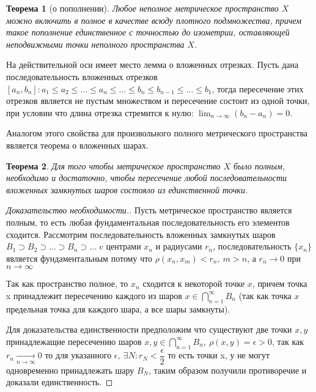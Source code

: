 \documentclass[14pt,a4paper]{extarticle}
\newtheorem{theorem}{Теорема}[section]
\theoremstyle{definition}
\theoremstyle{remark}
\renewcommand{\[}{\begin{dmath*}[compact]}
\renewcommand{\]}{\end{dmath*}}
\newcommand{\ds}{\displaystyle}
\newcommand{\sep}{ , \ \allowbreak }
\newcommand\f[2]{\dfrac{#1}{#2}}
\begin{document}
\begin{theorem}[о пополнении]
\label{th:о пополнении}
  Любое неполное метрическое пространство $X$ можно
  включить в полное в качестве всюду плотного подмножества,
  причем такое пополнение единственное с точностью до изометрии,
  оставляющей неподвижными точки неполного пространства $X$.
\end{theorem}

На действительной оси имеет место лемма о вложенных отрезках. Пусть дана
последовательность вложенных отрезков $[a_n, b_n]: a_1 \leq a_2 \leq \dots \leq
a_n \leq \dots \leq b_n \leq b_{n-1} \leq \dots \leq b_1 $, тогда пересечение
этих отрезков является не пустым множеством и пересечение состоит из одной
точки, при условии что длина отрезка стремится к нулю:
$\ds \lim_{n \to \infty}(b_n - a_n) = 0$.

Аналогом этого свойства для произвольного полного метрического пространства
является теорема о вложенных шарах.

\begin{theorem}
  Для того чтобы метрическое пространство $X$ было полным,
  необходимо и достаточно, чтобы пересечение любой последовательности вложенных
  замкнутых шаров состояло из единственной точки.
\end{theorem}

\begin{proof}[Доказательство необходимости.]
  Пусть метрическое пространство является полным, то есть любая фундаментальная
  последовательность его элементов сходится. Рассмотрим последовательность
  вложенных замкнутых шаров
  $B_{1} \supset B_{2} \supset \dots \supset B_{n} \supset \dots$
  c центрами $x_{n}$ и радиусами $r_{n}$, последовательность $\{x_n\}$ является
  фундаментальным потому что $\rho(x_n, x_m) < r_n\sep m > n$,
  а $r_n \to 0$ при $n \to \infty$

  Так как пространство полное, то $x_{n}$ сходится к некоторой точке $x$,
  причем точка x принадлежит пересечению каждого из шаров
  $x \in \bigcap _{n = 1}^{\infty} B_{n}$ (так как точка $x$
  предельная точка для каждого шара, а все шары замкнуты).

  Для доказательства единственности предположим что существуют две точки $x, y$
  принадлежащие пересечению шаров
  $x, y \in \bigcap _{n = 1}^{\infty} B_{n} \sep \rho(x, y) = \epsilon > 0$,
  так как $r_n \underset{n \to \infty}{\to} 0$ то для указанного
  $\epsilon \sep \exists N: r_N < \f\epsilon2$
  то есть точки x, у не могут одновременно принадлежать шару $B_N$, таким образом
  получили противоречие и доказали единственность.
\end{proof}
\end{document}
